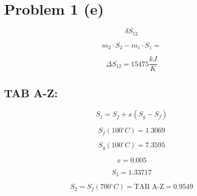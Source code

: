 \section*{Problem 1 (e)}

\begin{equation*}
    \delta S_{12}
\end{equation*}

\begin{equation*}
    m_2 \cdot S_2 - m_1 \cdot S_1 =
\end{equation*}

\begin{equation*}
    \Delta S_{12} = 15475 \frac{kJ}{K}
\end{equation*}

\subsection*{TAB A-Z:}

\begin{equation*}
    S_1 = S_f + x (S_g - S_f)
\end{equation*}

\begin{equation*}
    S_f (100^\circ C) = 1.3069
\end{equation*}

\begin{equation*}
    S_g (100^\circ C) = 7.3595
\end{equation*}

\begin{equation*}
    x = 0.005
\end{equation*}

\begin{equation*}
    S_1 = 1.33717
\end{equation*}

\begin{equation*}
    S_2 = S_f (700^\circ C) = \text{TAB A-Z} = 0.9549
\end{equation*}
